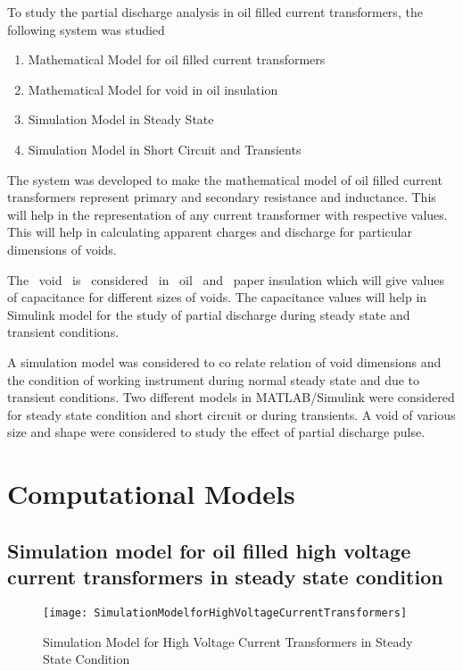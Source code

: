 
To study the partial discharge analysis in oil filled current transformers, the following system was studied

\begin{enumerate}
\item Mathematical Model for oil filled current transformers
\item Mathematical Model for void in oil insulation
\item Simulation Model in Steady State 
\item Simulation Model in Short Circuit and Transients 
\end{enumerate}

The system was developed to make the mathematical model of oil filled current transformers represent primary and secondary resistance and inductance. This will help in the representation of any current transformer with respective values. This will help in calculating apparent charges and discharge for particular dimensions of voids\setlength{\parskip}{1em}.

The ~void ~is ~considered ~in ~oil ~and ~paper insulation which will give values of capacitance for different sizes of voids. The capacitance values will help in Simulink model for the study of partial discharge during steady state and transient conditions.

A simulation model was considered to co relate relation of void dimensions and the condition of working instrument during normal steady state and due to transient conditions. Two different models in MATLAB/Simulink were considered for steady state condition and short circuit or during transients. A void of various size and shape were considered to study the effect of partial discharge pulse\setlength{\parskip}{0em}.

\section{Computational Models}
\subsection{Simulation model for oil filled high voltage current transformers in steady state condition}

\begin{figure}[h!]
\centering
\texttt{[image: SimulationModelforHighVoltageCurrentTransformers]}
\caption{Simulation Model for High Voltage Current Transformers in Steady State Condition}
\label{fig:Simulation Model for High Voltage Current Transformers in Steady State Condition}
\end{figure}

